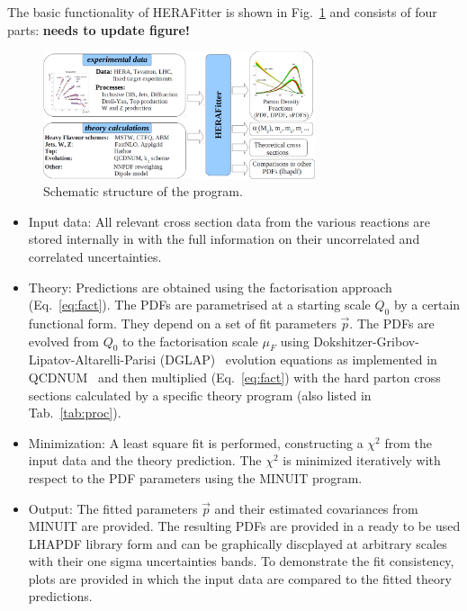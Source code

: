 The basic functionality of HERAFitter is shown in Fig.~\ref{fig:flow} and consists
of four parts: {\bf needs to update figure!}
\begin{figure}[!ht]
   \centering
   \includegraphics[width=8cm]{flow.pdf}
   \caption{Schematic structure of the \fitter program.} 
 \label{fig:flow}
\end{figure}
\begin{itemize}
\item 
Input data: All relevant cross section data from the various reactions
are stored internally in \fitter with the full information on their uncorrelated and correlated
uncertainties.
\item
    Theory: Predictions are obtained using the factorisation approach (Eq.~\ref{eq:fact}).
The PDFs are parametrised at a starting scale $Q_0$  by a certain functional form.
They depend on a set of fit parameters $\vec{p}$. 
The PDFs are  evolved from $Q_0$ to the factorisation scale $\mu_F$ using 
Dokshitzer-Gribov-Lipatov-Altarelli-Parisi 
(DGLAP)~\cite{Gribov:1972ri,Gribov:1972rt,Lipatov:1974qm,
Dokshitzer:1977sg,Altarelli:1977zs} evolution equations 
as implemented in QCDNUM~\cite{qcdnum} 
and then multiplied (Eq.~\ref{eq:fact}) with the hard parton cross sections calculated by
a specific theory program (also listed in Tab.~\ref{tab:proc}).
\item
Minimization: A least square fit is performed, constructing a 
$\chi^2$ from the input data and the theory prediction.
The $\chi^2$ is  minimized iteratively 
with respect to the PDF parameters using the MINUIT program.
%
%
\item
Output: The fitted parameters $\vec{p}$ and their estimated covariances
from MINUIT are provided.
The resulting PDFs are provided in a ready to be used LHAPDF library form
and can be graphically 
discplayed at arbitrary scales with their one sigma uncertainties bands.
To demonstrate the fit consistency, plots are provided 
in which the input data are compared to the fitted theory predictions.
\end{itemize}
